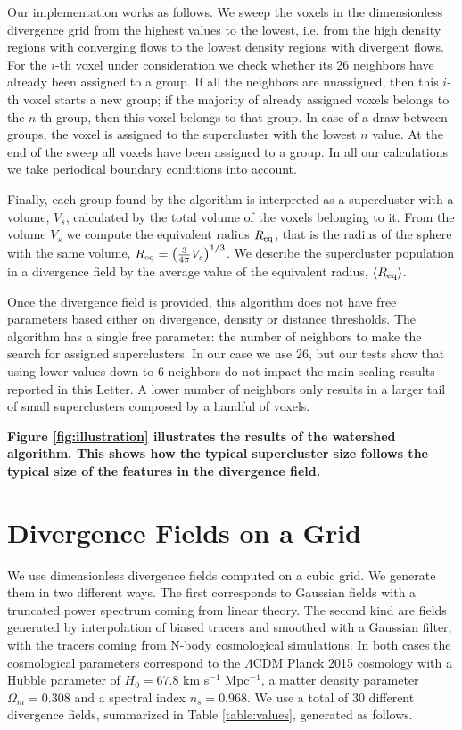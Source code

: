 \documentclass[usenatbib]{mnras}
\begin{document}
Our implementation works as follows. 
We sweep the voxels in the dimensionless divergence grid from the highest values to the lowest, i.e. from the high density regions with converging flows to the lowest density regions with divergent flows.
For the $i$-th voxel under consideration we check whether its 26 neighbors have already been assigned to a group. 
If all the neighbors are unassigned, then this $i$-th voxel starts a new group; if the majority of already assigned voxels belongs to the $n$-th group, then this voxel belongs to that group.
In case of a draw between groups, the voxel is assigned to the supercluster with the lowest $n$ value.
At the end of the sweep all voxels have been assigned to a group. 
In all our calculations we take periodical boundary conditions into account.  

Finally, each group found by the algorithm is interpreted as a supercluster 
with a volume, $V_s$, calculated by the total volume of the voxels belonging to it.
From the volume $V_s$ we compute the equivalent radius $R_{\rm eq}$, that is the radius of the sphere with the same volume, 
   $ R_{\rm eq} = \left(\frac{3}{4\pi}V_{s}\right)^{1/3}$.
We describe the supercluster population in a divergence field by the average value of the equivalent radius, $\langle R_{\rm eq}\rangle$.

Once the divergence field is provided, this algorithm  does not have free parameters based either on divergence, density or distance thresholds. 
The algorithm has a single free parameter: the number of neighbors to make the search for assigned superclusters.
In our case we use $26$, but our tests show that using lower values down to $6$ neighbors do not impact the main scaling results reported in this Letter. 
A lower number of neighbors only results in a larger tail of small superclusters composed by a handful of voxels.

\textbf{Figure \ref{fig:illustration} illustrates the results of the watershed algorithm. 
This shows how the typical supercluster size follows the typical size of the features in the divergence field.}


\section{Divergence Fields on a Grid}
\label{sec:fields}

We use dimensionless divergence fields computed on a cubic grid. 
We generate them in two different ways.
The first corresponds to Gaussian fields with a truncated power spectrum coming from linear theory.
The second kind are fields generated by interpolation of biased tracers and smoothed with a Gaussian filter, with the tracers coming from N-body cosmological simulations.
In both cases the cosmological parameters correspond to the
$\Lambda$CDM Planck 2015 cosmology \citep{2016A&A...594A..13P} with a Hubble parameter of $H_0=67.8$ km s$^{-1}$ Mpc$^{-1}$, a matter density parameter $\Omega_m=0.308$ and a spectral index $n_s=0.968$.
We use a total of $30$ different divergence fields, summarized in Table \ref{table:values}, generated as follows.
\end{document}
